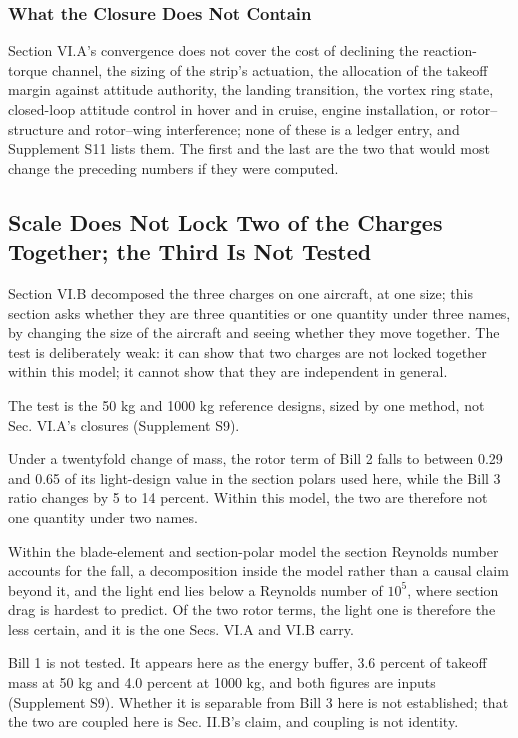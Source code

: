 \documentclass[journal]{new-aiaa}
\begin{document}
\subsubsection{What the Closure Does Not Contain}

Section VI.A's convergence does not cover the cost of declining the reaction-torque channel, the sizing of the strip's actuation, the allocation of the takeoff margin against attitude authority, the landing transition, the vortex ring state, closed-loop attitude control in hover and in cruise, engine installation, or rotor--structure and rotor--wing interference; none of these is a ledger entry, and Supplement S11 lists them. The first and the last are the two that would most change the preceding numbers if they were computed.

\subsection{Scale Does Not Lock Two of the Charges Together; the Third Is Not Tested}

Section VI.B decomposed the three charges on one aircraft, at one size; this section asks whether they are three quantities or one quantity under three names, by changing the size of the aircraft and seeing whether they move together. The test is deliberately weak: it can show that two charges are not locked together within this model; it cannot show that they are independent in general.

The test is the 50 kg and 1000 kg reference designs, sized by one method, not Sec. VI.A's closures (Supplement S9).

Under a twentyfold change of mass, the rotor term of Bill 2 falls to between 0.29 and 0.65 of its light-design value in the section polars used here, while the Bill 3 ratio changes by 5 to 14 percent. Within this model, the two are therefore not one quantity under two names.

Within the blade-element and section-polar model the section Reynolds number accounts for the fall, a decomposition inside the model rather than a causal claim beyond it, and the light end lies below a Reynolds number of $10^5$, where section drag is hardest to predict. Of the two rotor terms, the light one is therefore the less certain, and it is the one Secs. VI.A and VI.B carry.

Bill 1 is not tested. It appears here as the energy buffer, 3.6 percent of takeoff mass at 50 kg and 4.0 percent at 1000 kg, and both figures are inputs (Supplement S9). Whether it is separable from Bill 3 here is not established; that the two are coupled here is Sec. II.B's claim, and coupling is not identity.
\end{document}

